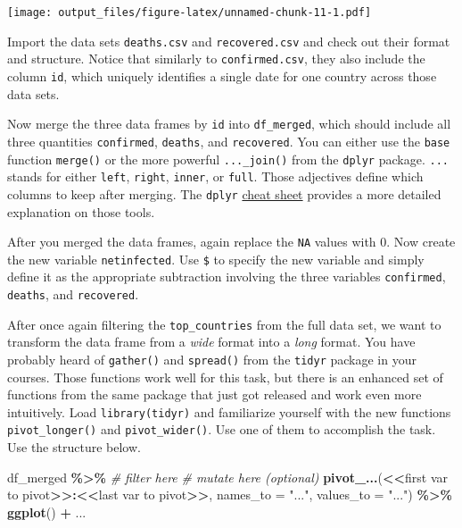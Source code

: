 \documentclass[
  11pt,
]{article}
\newenvironment{Shaded}{\begin{snugshade}}{\end{snugshade}}
\newcommand{\CommentTok}[1]{\textcolor[rgb]{0.56,0.35,0.01}{\textit{#1}}}
\newcommand{\DataTypeTok}[1]{\textcolor[rgb]{0.13,0.29,0.53}{#1}}
\newcommand{\ErrorTok}[1]{\textcolor[rgb]{0.64,0.00,0.00}{\textbf{#1}}}
\newcommand{\KeywordTok}[1]{\textcolor[rgb]{0.13,0.29,0.53}{\textbf{#1}}}
\newcommand{\NormalTok}[1]{#1}
\newcommand{\OperatorTok}[1]{\textcolor[rgb]{0.81,0.36,0.00}{\textbf{#1}}}
\newcommand{\StringTok}[1]{\textcolor[rgb]{0.31,0.60,0.02}{#1}}
\newenvironment{tips}[1]
  {
  \begin{itemize}
  \footnotesize
  \renewcommand{\labelitemi}{
    \raisebox{-.7\height}[0pt][0pt]{
      {\setkeys{Gin}{width=3em,keepaspectratio}
        \texttt{[image: images/\#1.png]}}
    }
  }
  \setlength{\fboxsep}{1em}
  \begin{rbox}
  \item
  }
  {
  \end{rbox}
  \end{itemize}
  }
\begin{document}
\texttt{[image: output\_files/figure-latex/unnamed-chunk-11-1.pdf]}

\begin{tips}r

Import the data sets \texttt{deaths.csv} and \texttt{recovered.csv} and check out their format and structure. Notice that similarly to \texttt{confirmed.csv}, they also include the column \texttt{id}, which uniquely identifies a single date for one country across those data sets.

Now merge the three data frames by \texttt{id} into \texttt{df\_merged}, which should include all three quantities \texttt{confirmed}, \texttt{deaths}, and \texttt{recovered}. You can either use the \texttt{base} function \texttt{merge()} or the more powerful \texttt{...\_join()} from the \texttt{dplyr} package. \texttt{...} stands for either \texttt{left}, \texttt{right}, \texttt{inner}, or \texttt{full}. Those adjectives define which columns to keep after merging. The \texttt{dplyr} \href{https://rstudio.com/wp-content/uploads/2015/02/data-wrangling-cheatsheet.pdf}{cheat sheet} provides a more detailed explanation on those tools.

After you merged the data frames, again replace the \texttt{NA} values with 0.
Now create the new variable \texttt{netinfected}. Use \texttt{\$} to specify the new variable and simply define it as the appropriate subtraction involving the three variables \texttt{confirmed}, \texttt{deaths}, and \texttt{recovered}.

After once again filtering the \texttt{top\_countries} from the full data set, we want to transform the data frame from a \emph{wide} format into a \emph{long} format. You have probably heard of \texttt{gather()} and \texttt{spread()} from the \texttt{tidyr} package in your courses. Those functions work well for this task, but there is an enhanced set of functions from the same package that just got released and work even more intuitively. Load \texttt{library(tidyr)} and familiarize yourself with the new functions \texttt{pivot\_longer()} and \texttt{pivot\_wider()}. Use one of them to accomplish the task. Use the structure below.

\begin{Shaded}
\begin{Highlighting}[]
\NormalTok{df\_merged }\OperatorTok{\%\textgreater{}\%}\StringTok{ }
\CommentTok{\# filter here}
\CommentTok{\# mutate here (optional)}
\StringTok{  }\KeywordTok{pivot\_...}\NormalTok{(}\OperatorTok{\textless{}}\ErrorTok{\textless{}}\NormalTok{first var to pivot}\OperatorTok{\textgreater{}}\ErrorTok{\textgreater{}:\textless{}\textless{}}\NormalTok{last var to pivot}\OperatorTok{\textgreater{}}\ErrorTok{\textgreater{}}\NormalTok{,}
            \DataTypeTok{names\_to =} \StringTok{"..."}\NormalTok{,}
            \DataTypeTok{values\_to =} \StringTok{"..."}\NormalTok{) }\OperatorTok{\%\textgreater{}\%}
\KeywordTok{ggplot}\NormalTok{() }\OperatorTok{+}
\NormalTok{...}
\end{Highlighting}
\end{Shaded}


\end{tips}
\end{document}
